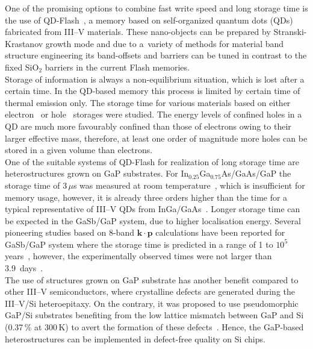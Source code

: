 One of the promising options to combine fast write speed and long storage time is the use of QD-Flash~\citep{Geller_APL2008_QDFlash}, a memory based on self-organized quantum dots (QDs) fabricated from III--V materials. These nano-objects can be prepared by Stranski-Krastanov growth mode and due to a~variety of methods for material band structure engineering its band-offsets and barriers can be tuned in contrast to the fixed SiO$_2$ barriers in the current Flash memories.\\
%
\indent Storage of information is always a non-equilibrium situation, which is lost after a certain time. In the QD-based memory this process is limited by certain time of thermal emission only. The storage time for various materials based on either electron~\citep{Anand_apl1995_elflash,Nowozin_2013_sum} or hole~\citep{GellerPRB, stracke_apl2012_qdflash_GaP,Nowozin_2013_sum} storages were studied. The energy levels of confined holes in a QD are much more favourably confined than those of electrons owing to their larger effective mass, therefore, at least one order of magnitude more holes can be stored in a given volume than electrons. \\
%
\indent One of the suitable systems of QD-Flash for realization of long storage time are heterostructures grown on GaP substrates. For In$_{0.25}$Ga$_{0.75}$As/GaAs/GaP the storage time of 3$\,$$\mu$s was measured at room temperature~\citep{stracke_apl2012_qdflash_GaP}, which is insufficient for memory usage, however, it is already three orders higher than the time for a typical representative of III--V QDs from InGa/GaAs~\citep{GellerPRB}. Longer storage time can be expected in the GaSb/GaP system, due to higher localisation energy. Several pioneering studies based on 8-band $\mathbf{k\cdot p}$ calculations have been reported for GaSb/GaP system where the storage time is predicted in a range of 1 to $10^5$ years~\citep{Bimberg_proceedingSPIE}, however, the experimentally observed times were not larger than 3.9~days~\citep{Bonato_pssolidi_GaSbonGaP}.\\%
%
\indent The use of structures grown on GaP substrate has another benefit compared to other III--V semiconductors, where crystalline defects are generated during the III--V/Si heteroepitaxy. On the contrary, it was proposed to use pseudomorphic GaP/Si substrates benefiting from the low lattice mismatch between GaP and Si (0.37$\,$\% at 300$\,$K) to avert the formation of these defects~\citep{Beyer_jap2013,Grassman_apl2013, Lin_jcg2013}. Hence, the GaP-based heterostructures can be implemented in defect-free quality on Si chips.

